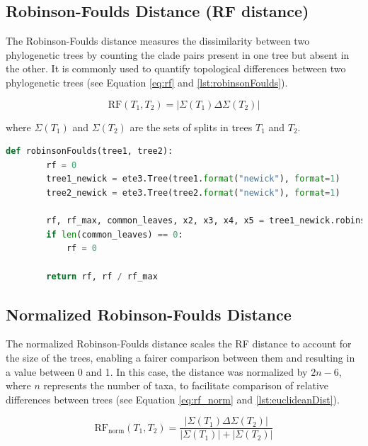 \subsection{Robinson-Foulds Distance (RF distance)}\label{RF}
The Robinson-Foulds distance measures the dissimilarity between two phylogenetic trees by counting the clade pairs present in one tree but absent in the other. It is commonly used to quantify topological differences between two phylogenetic trees (see Equation \eqref{eq:rf} and \autoref{lst:robinsonFoulds}).

\begin{equation}\label{eq:rf}
    \text{RF}(T_1, T_2) = | \Sigma(T_1) \Delta \Sigma(T_2) |
\end{equation}

where $\Sigma(T_1)$ and $\Sigma(T_2)$ are the sets of splits in trees $T_1$ and $T_2$.

\begin{lstlisting}[label=lst:robinsonFoulds,language=Python,caption=Python script for calculating the Robinson-Foulds distance using the ete3 package in the aPhyloGeo package]
    def robinsonFoulds(tree1, tree2):
        rf = 0
        tree1_newick = ete3.Tree(tree1.format("newick"), format=1)
        tree2_newick = ete3.Tree(tree2.format("newick"), format=1)

        rf, rf_max, common_leaves, x2, x3, x4, x5 = tree1_newick.robinson_foulds(tree2_newick, unrooted_trees=True)
        if len(common_leaves) == 0:
            rf = 0

        return rf, rf / rf_max
\end{lstlisting}


\subsection{Normalized Robinson-Foulds Distance}\label{RFnorm}
The normalized Robinson-Foulds distance scales the RF distance to account for the size of the trees, enabling a fairer comparison between them and resulting in a value between 0 and 1. In this case, the distance was normalized by $2n-6$, where $n$ represents the number of taxa, to facilitate comparison of relative differences between trees (see Equation \eqref{eq:rf_norm} and \autoref{lst:euclideanDist}).

\begin{equation}\label{eq:rf_norm}
    \text{RF}_{\text{norm}}(T_1, T_2) = \frac{| \Sigma(T_1) \Delta \Sigma(T_2) |}{| \Sigma(T_1) | + | \Sigma(T_2) |}
\end{equation}

